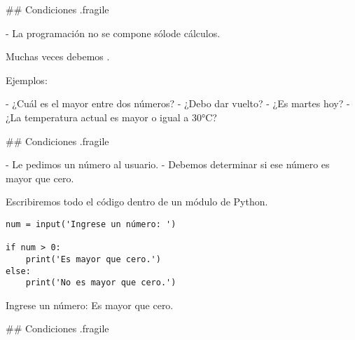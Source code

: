 ## Condiciones {.fragile}

- La programación no se compone sólo\newline de cálculos.


\vspace{-.6ex}

\pause

\bgnblockidea
Muchas veces debemos .
\trmblockidea

\vspace{2ex}

Ejemplos:

- ¿Cuál es el mayor entre dos números?
- ¿Debo dar vuelto?
- ¿Es martes hoy?
- ¿La temperatura actual es mayor o igual a 30°C?

## Condiciones {.fragile}


- Le pedimos un número al usuario.
- Debemos determinar si ese número es mayor que cero.

\bgnblocknormal[wd=.8\textwidth,centered]
Escribiremos todo el código dentro de un módulo de Python.
\trmblocknormal


\pause

\bgncolumns
{}
\vspace{-1ex}

\begin{lstlisting}
num = input('Ingrese un número: ')

if num > 0:
    print('Es mayor que cero.')
else:
    print('No es mayor que cero.')
\end{lstlisting}

\vspace{-1ex}

\begin{exampleConsole}
Ingrese un número: 
Es mayor que cero.
\end{exampleConsole}

\trmcolumns


## Condiciones {.fragile}

